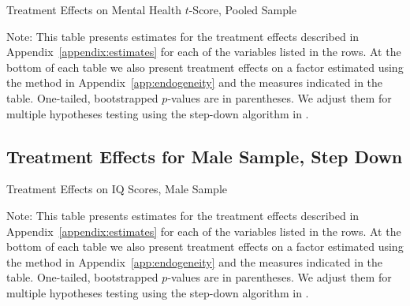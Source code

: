 	\begin{table}[H]
     \caption{Treatment Effects on Mental Health $t$-Score, Pooled Sample}
     \label{table:abccare_rslt_pooled_cat15_sd}
	
	\end{table} 
\begin{spacing}{1}
\begin{footnotesize}
\noindent Note: This table presents estimates for the treatment effects described in Appendix~\ref{appendix:estimates} for each of the variables listed in the rows. At the bottom of each table we also present treatment effects on a factor estimated using the method in Appendix~\ref{app:endogeneity} and the measures indicated in the table. One-tailed, bootstrapped $p$-values are in parentheses. We adjust them for multiple hypotheses testing using the step-down algorithm in \citet{Romano_Wolf_2016_pval_SaPL}. 
\end{footnotesize}
\end{spacing}

\subsection{Treatment Effects for Male Sample, Step Down}


	\begin{table}[H]
     \caption{Treatment Effects on IQ Scores, Male Sample}
     \label{table:abccare_rslt_male_cat0_sd}
	
	\end{table} 
\begin{spacing}{1}
\begin{footnotesize}
\noindent Note: This table presents estimates for the treatment effects described in Appendix~\ref{appendix:estimates} for each of the variables listed in the rows. At the bottom of each table we also present treatment effects on a factor estimated using the method in Appendix~\ref{app:endogeneity} and the measures indicated in the table. One-tailed, bootstrapped $p$-values are in parentheses. We adjust them for multiple hypotheses testing using the step-down algorithm in \citet{Romano_Wolf_2016_pval_SaPL}. 
\end{footnotesize}
\end{spacing}

